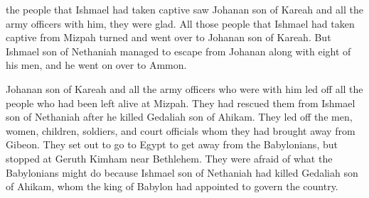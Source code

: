 {the people
that
Ishmael
had taken captive
saw Johanan
son
of Kareah
and all
the army
officers
with
him, they were glad.
All
those
people
that
Ishmael
had taken captive
from
Mizpah
turned
and went
over to Johanan
son
of Kareah.
But Ishmael
son
of Nethaniah
managed to escape
from Johanan
along with eight
of his men,
and he went
on over to
Ammon.
\par }{\PP {}Johanan
son
of Kareah
and all
the army
officers
who
were with
him led off all
the people
who had been left alive
at Mizpah.
They had rescued
them from
Ishmael
son
of Nethaniah
after
he killed
Gedaliah
son
of Ahikam.
They led off the men,
women,
children,
soldiers,
and court officials
whom
they had brought away
from Gibeon.
They set out
to go to
Egypt
to get away
from the Babylonians, but stopped
at Geruth
Kimham near
Bethlehem.
They were afraid
of what
the Babylonians
might do
because
Ishmael
son
of Nethaniah
had killed
Gedaliah
son
of Ahikam,
whom
the king
of Babylon
had appointed to govern
the country.

}
